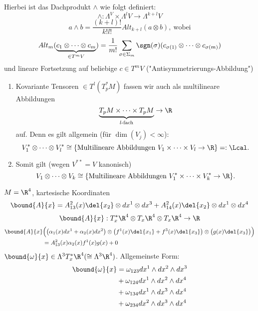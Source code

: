 Hierbei ist das Dachprodukt $\wedge$ wie folgt definiert:
\[ \wedge: \Lambda^ V \times \Lambda^l V \to \Lambda^{k+l} V \]
\[ a \wedge b = \frac{(k+l)!}{k!l!} Alt_{k+l} (a\otimes b),\ \text{wobei} \]
\[ Alt_m (\underbrace{c_1 \otimes \dots \otimes c_m}_{\in T^mV}) = \frac{1}{m!} \sum_{\sigma \in \Sigma_m} \sgn(\sigma) (c_{\sigma(1)} \otimes \dots \otimes c_{\sigma(m)}) \]
und lineare Fortsetzung auf beliebige $c \in T^m V$ ("Antisymmetrierungs-Abbildung")

\begin{rem}
	\begin{enumerate}[label={\roman*})]
		\item Kovariante Tensoren $ \in T^l(T_p^*M) $ fassen wir auch als multilineare Abbildungen
			\[ \underbrace{T_pM \times \dots \times T_pM}_{l\text{-fach}} \to \R \]
			auf. Denn es gilt allgemein (für $\dim(V_j)<\infty$):
			\[ V_1^* \otimes \dots \otimes V_l^* \cong \{ \text{Multilineare Abbildungen } V_1 \times \dots \times V_l \to \R \} =: \Lcal. \]
		\item Somit gilt (wegen $V^{**} = V$ kanonisch)
			\[ V_1 \otimes \dots \otimes V_k \cong \{ \text{Multilineare Abbildungen } V_1^* \times \dots \times V_k^* \to \R \}. \]
	\end{enumerate}
\end{rem}

\begin{exmp*}
	$ M = \R^4 $, kartesische Koordinaten
	\[ \bound{A}{x} = A_{13}^2(x) \del{x_2} \otimes dx^1 \otimes dx^3 + A_{14}^2(x) \del{x_2} \otimes dx^1 \otimes dx^4 \]
	\[ \bound{A}{x} : T_x^*\R^4 \otimes T_x\R^4 \otimes T_x\R^4 \to \R \]
	\begin{align*}
		\bound{A}{x} &\Big( \big(\alpha_1(x) dx^1 + \alpha_2(x) dx^2\big) \otimes \big(f^1(x)\del{x_1} + f^3(x)\del{x_3}\big) \otimes \big(g(x) \del{x_3}\big) \Big) \\&= A_{13}^2(x) \alpha_2(x) f^1(x) g(x) + 0
	\end{align*}
	$ \bound{\omega}{x} \in \Lambda^3 T_x^*\R^4 (\cong \Lambda^3 \R^4) $. Allgemeinste Form:
	\begin{align*}
		\bound{\omega}{x} &= \omega_{123} dx^1 \wedge dx^2 \wedge dx^3\\
		&+ \omega_{124} dx^1 \wedge dx^2 \wedge dx^4\\
		&+ \omega_{134} dx^1 \wedge dx^3 \wedge dx^4\\
		&+ \omega_{234} dx^2 \wedge dx^3 \wedge dx^4
	\end{align*}
\end{exmp*}

